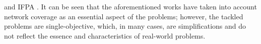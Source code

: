 \documentclass[preprint,12pt]{elsarticle}
\begin{document}
\cite{panag2019maximal} and IFPA \cite{wang2019wireless}. It can be seen that the aforementioned works have taken into account network coverage as an essential aspect of the problems; however, the tackled problems are single-objective, which, in many cases, are simplifications and do not reflect the essence and characteristics of real-world problems.

\end{document}
